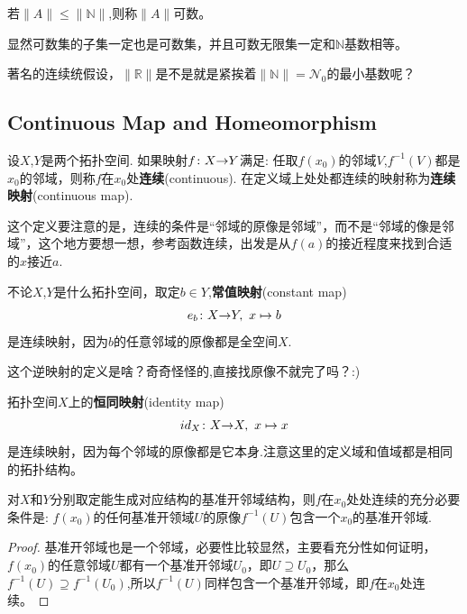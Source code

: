 \begin{definition}
若$\|A\| \leqslant \|\mathbb{N}\|$,则称$\|A\|$可数。 
\end{definition}

显然可数集的子集一定也是可数集，并且可数无限集一定和$\mathbb{N}$基数相等。

著名的连续统假设，$\|\mathbb{R}\|$是不是就是紧挨着$\|\mathbb{N}\|=\mathcal{N}_0$的最小基数呢？
\newpage
\subsection{Continuous Map and Homeomorphism}

\begin{definition}
设$X$,$Y$是两个拓扑空间. 如果映射${f}\colon{X}{\to}{Y}$满足: 任取$f(x_0)$的邻域$V$,$f^{-1}(V)$都是$x_0$的邻域，则称$f$在$x_0$处\textbf{连续}(continuous). 在定义域上处处都连续的映射称为\textbf{连续映射}(continuous map).
\end{definition}

这个定义要注意的是，连续的条件是“邻域的原像是邻域”，而不是“邻域的像是邻域”，这个地方要想一想，参考函数连续，出发是从$f(a)$的接近程度来找到合适的$x$接近$a$.

\begin{example}
不论$X$,$Y$是什么拓扑空间，取定$b \in Y$,\textbf{常值映射}(constant map)\[{e_b}\colon{X}{\to}{Y},\ x \mapsto b\]是连续映射，因为$b$的任意邻域的原像都是全空间$X$.
\end{example}

这个逆映射的定义是啥？奇奇怪怪的,直接找原像不就完了吗？:)

\begin{example}
拓扑空间$X$上的\textbf{恒同映射}(identity map)\[{id_{X}}\colon{X}{\to}{X},\ x\mapsto x\]是连续映射，因为每个邻域的原像都是它本身.注意这里的定义域和值域都是相同的拓扑结构。
\end{example}

\begin{proposition}
对$X$和$Y$分别取定能生成对应结构的基准开邻域结构，则$f$在$x_0$处处连续的充分必要条件是: $f(x_0)$的任何基准开领域$U$的原像$f^{-1}(U)$包含一个$x_0$的基准开邻域.
\end{proposition}

\begin{proof}
基准开邻域也是一个邻域，必要性比较显然，主要看充分性如何证明，$f(x_0)$的任意邻域$U$都有一个基准开邻域$U_0$，即$U \supseteq U_0$，那么$f^{-1}(U) \supseteq f^{-1}(U_0)$,所以$f^{-1}(U)$同样包含一个基准开邻域，即$f$在$x_0$处连续。
\end{proof}

